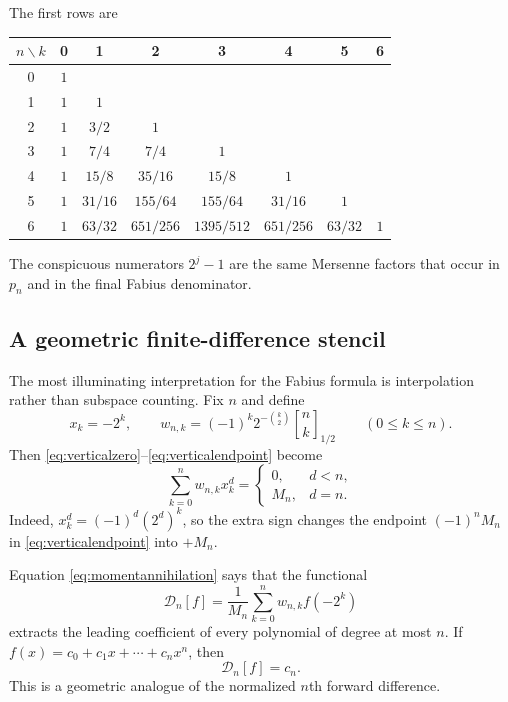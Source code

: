 \documentclass[11pt,oneside]{article}
\theoremstyle{definition}
\theoremstyle{remark}
\newcommand{\halfqbinom}[2]{{\genfrac{[}{]}{0pt}{}{#1}{#2}}_{1/2}}
\begin{document}
The first rows are
\begin{center}
\begin{tabular}{@{}c*{7}{c}@{}}
\toprule
$n\backslash k$&0&1&2&3&4&5&6\\
\midrule
0&$1$\\
1&$1$&$1$\\
2&$1$&$3/2$&$1$\\
3&$1$&$7/4$&$7/4$&$1$\\
4&$1$&$15/8$&$35/16$&$15/8$&$1$\\
5&$1$&$31/16$&$155/64$&$155/64$&$31/16$&$1$\\
6&$1$&$63/32$&$651/256$&$1395/512$&$651/256$&$63/32$&$1$\\
\bottomrule
\end{tabular}
\end{center}
The conspicuous numerators $2^j-1$ are the same Mersenne factors that occur in $p_n$ and in the final Fabius denominator.

\subsection{A geometric finite-difference stencil}

The most illuminating interpretation for the Fabius formula is interpolation rather than subspace counting.  Fix $n$ and define
\begin{equation}\label{eq:nodesweights}
 x_k=-2^k,
 \qquad
 w_{n,k}=(-1)^k2^{-\binom{k}{2}}\halfqbinom{n}{k}
 \qquad(0\le k\le n).
\end{equation}
Then \eqref{eq:verticalzero}--\eqref{eq:verticalendpoint} become
\begin{equation}\label{eq:momentannihilation}
 \sum_{k=0}^{n}w_{n,k}x_k^d=
 \begin{cases}
 0,&d<n,\\
 M_n,&d=n.
 \end{cases}
\end{equation}
Indeed, $x_k^d=(-1)^d(2^d)^k$, so the extra sign changes the endpoint $(-1)^nM_n$ in \eqref{eq:verticalendpoint} into $+M_n$.

Equation \eqref{eq:momentannihilation} says that the functional
\begin{equation}\label{eq:Dndef}
 \mathcal D_n[f]=\frac1{M_n}\sum_{k=0}^{n}w_{n,k}f(-2^k)
\end{equation}
extracts the leading coefficient of every polynomial of degree at most $n$.  If
$f(x)=c_0+c_1x+\cdots+c_nx^n$, then
\[
 \mathcal D_n[f]=c_n.
\]
This is a geometric analogue of the normalized $n$th forward difference.
\end{document}
